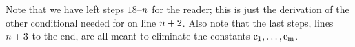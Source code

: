 \begin{PROOF}
\begin{gproofnn}
{\galinend{ }{ }{ }
}
\gline{$\integer{n}+1$}{$[\pardisjunction{\parconjunction{\CAPTHETA}{\CAPPSI}}{\parconjunction{\negation{\CAPTHETA}}{\negation{\CAPPSI}}}\HORSESHOE$}{ }
\glinend{ }{$\qquad\partriplebar{\CAPTHETA}{\CAPPSI}]\constant{c_{\integer{1}}}\ldots\constant{c_{\integer{\integer{m}}}}/\variable{x}_1\ldots\variable{x}_{\integer{m}}$}{\Rule{$\HORSESHOE$-Intro}, 18--$\integer{n}$}
\gline{$\integer{n}+2$}{$[\partriplebar{\CAPTHETA}{\CAPPSI}\TRIPLEBAR$}{\Rule{$\TRIPLEBAR$-Intro}, 17,}
\glinend{ }{$\qquad\pardisjunction{\parconjunction{\CAPTHETA}{\CAPPSI}}{\parconjunction{\negation{\CAPTHETA}}{\negation{\CAPPSI}}}]\constant{c_{\integer{1}}}\ldots\constant{c_{\integer{\integer{m}}}}/\variable{x}_1\ldots\variable{x}_{\integer{m}}$}{$\integer{n}+1$}
\glinend{ }{ }{ }
\glinend{ }{$\qquad\vdots$}{ }
\glinend{ }{ }{ }
\end{gproofnn}
\noindent{}Note that we have left steps $18$--$\integer{n}$ for the reader; 
this is just the derivation of the other conditional needed for  on line $\integer{n}+2$. 
Also note that the last steps, lines $n+3$ to the end, are all  meant to eliminate the constants $\mathrm{c_{1}},\ldots,\mathrm{c_{m}}$.
\end{PROOF}
